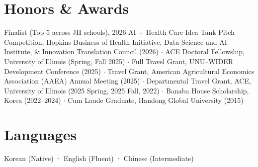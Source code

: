 \documentclass[a4paper,11pt]{article}
\begin{document}
\section{\textbf{Honors \& Awards}}
\vspace{-0.4mm}

Finalist (Top 5 across JH schools), 2026 AI + Health Care Idea Tank Pitch Competition, Hopkins Business of Health Initiative, Data Science and AI Institute, \& Innovation Translation Council (2026) $\cdot$  
ACE Doctoral Fellowship, University of Illinois (Spring, Fall 2025) $\cdot$  
Full Travel Grant, UNU–WIDER Development Conference (2025) $\cdot$  
Travel Grant, American Agricultural Economics Association (AAEA) Annual Meeting (2025) $\cdot$  
Departmental Travel Grant, ACE, University of Illinois (2025 Spring, 2025 Fall, 2022) $\cdot$  
Banaba House Scholarship, Korea (2022–2024) $\cdot$  
Cum Laude Graduate, Handong Global University (2015)


\section{\textbf{Languages}}
Korean (Native) · English (Fluent) · Chinese (Intermediate)


\end{document}

